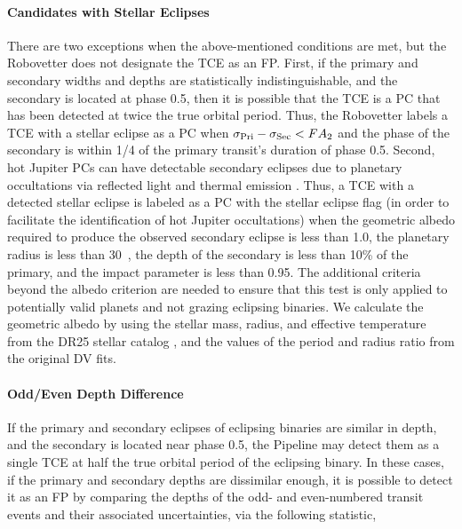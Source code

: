 \paragraph{Candidates with Stellar Eclipses}
\label{s:sscand}
There are two exceptions when the above-mentioned conditions are met, but the Robovetter does not designate the TCE as an FP. First, if the primary and secondary widths and depths are statistically indistinguishable, and the secondary is located at phase 0.5, then it is possible that the TCE is a PC that has been detected at twice the true orbital period. Thus, the Robovetter labels a TCE with a stellar eclipse as a PC when ${\sigma_{\rm Pri} - \sigma_{\rm Sec} < FA_{2}}$ and the phase of the secondary is within 1/4 of the primary transit's duration of phase 0.5. Second, hot Jupiter PCs can have detectable secondary eclipses due to planetary occultations via reflected light and thermal emission \citep{Coughlin2012,Christiansen2010}. Thus, a TCE with a detected stellar eclipse is labeled as a PC with the stellar eclipse flag (in order to facilitate the identification of hot Jupiter occultations) when the geometric albedo required to produce the observed secondary eclipse is less than 1.0, the planetary radius is less than 30~\re{}, the depth of the secondary is less than 10\% of the primary, and the impact parameter is less than 0.95. The additional criteria beyond the albedo criterion are needed to ensure that this test is only applied to potentially valid planets and not grazing eclipsing binaries. We calculate the geometric albedo by using the stellar mass, radius, and effective temperature from the DR25 stellar catalog \citep{Mathur2017ApJS}, and the values of the period and radius ratio from the original DV fits.



\paragraph{Odd/Even Depth Difference}

\label{s:oddeven}
If the primary and secondary eclipses of eclipsing binaries are similar in depth, and the secondary is located near phase 0.5, the \kepler{} Pipeline may detect them as a single TCE at half the true orbital period of the eclipsing binary. In these cases, if the primary and secondary depths are dissimilar enough, it is possible to detect it as an FP by comparing the depths of the odd- and even-numbered transit events and their associated uncertainties, via the following statistic,

